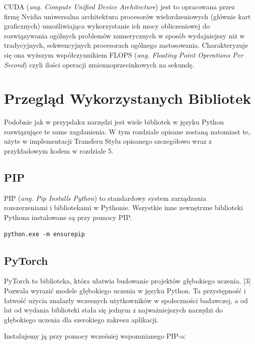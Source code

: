 \documentclass[brudnopis]{xmgr}
\begin{document}
CUDA (\textit{ang. Compute Unified Device Architecture}) jest to opracowana przez firmę Nvidia uniwersalna architektura procesorów wielordzeniowych (głównie kart graficznych) umożliwiająca wykorzystanie ich mocy obliczeniowej do rozwiązywania ogólnych problemów numerycznych w sposób wydajniejszy niż w tradycyjnych, sekwencyjnych procesorach ogólnego zastosowania. Charakteryzuje się ona wyższym współczynnikiem FLOPS (\textit{ang. Floating Point Operations Per Second}) czyli ilości operacji zmiennoprzecinkowych na sekundę.




\chapter{Przegląd Wykorzystanych Bibliotek}


Podobnie jak w przypdaku narzędzi jest wiele bibliotek w języku Python rozwiązujące te same zagdanienia. 
W tym rozdziale opisane zostaną natomiast te, użyte w implementacji Transferu Stylu opisanego szczegółowo wraz z przykładowym kodem w rozdziale 5.

 \section{PIP\label{s:dsssl}}
 PIP (\textit{ang. Pip Installs Python}) to standardowy system zarządzania rozszerzeniami i bibliotekami w Pythonie. Wszystkie inne zewnętrzne biblioteki Pythona instalowane są przy pomocy PIP.

\begin{lstlisting}
python.exe -m ensurepip
\end{lstlisting}


 

    \section{PyTorch\label{s:dsssl}}
    
    
PyTorch to biblioteka, która ułatwia budowanie projektów głębokiego uczenia. [3] Pozwala wyrazić modele głębokiego uczenia w języku Python. Ta przystępność i łatwość użycia znalazły wczesnych użytkowników w społeczności badawczej, a od lat od wydania biblioteki stała się jednym z najważniejszych narzędzi do głębokiego uczenia dla szerokiego zakresu aplikacji.

Instalujemy ją przy pomocy wcześniej wspomnianego PIP-a:
\end{document}
